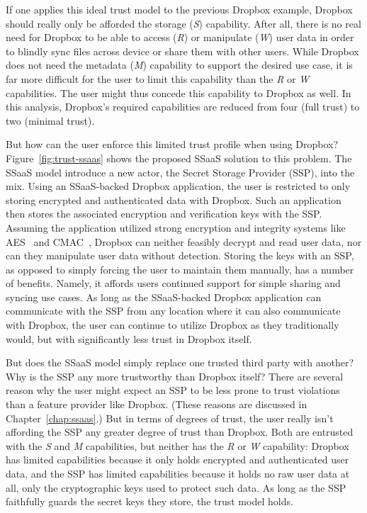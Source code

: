 If one applies this ideal trust model to the previous Dropbox example,
Dropbox should really only be afforded the storage (\emph{S})
capability. After all, there is no real need for Dropbox to be able to
access (\emph{R}) or manipulate (\emph{W}) user data in order to
blindly sync files across device or share them with other users. While
Dropbox does not need the metadata (\emph{M}) capability to support
the desired use case, it is far more difficult for the user to limit
this capability than the \emph{R} or \emph{W} capabilities. The user
might thus concede this capability to Dropbox as well. In this
analysis, Dropbox's required capabilities are reduced from four (full
trust) to two (minimal trust).

But how can the user enforce this limited trust profile when using
Dropbox?  Figure~\ref{fig:trust-ssaas} shows the proposed SSaaS
solution to this problem. The SSaaS model introduce a new actor, the
Secret Storage Provider (SSP), into the mix. Using an SSaaS-backed
Dropbox application, the user is restricted to only storing encrypted
and authenticated data with Dropbox. Such an application then stores
the associated encryption and verification keys with the SSP. Assuming
the application utilized strong encryption and integrity systems like
AES~\cite{nist2001} and CMAC~\cite{dworkin2005}, Dropbox can neither
feasibly decrypt and read user data, nor can they manipulate user data
without detection. Storing the keys with an SSP, as opposed to simply
forcing the user to maintain them manually, has a number of benefits.
Namely, it affords users continued support for simple sharing and
syncing use cases. As long as the SSaaS-backed Dropbox application can
communicate with the SSP from any location where it can also
communicate with Dropbox, the user can continue to utilize Dropbox as
they traditionally would, but with significantly less trust in Dropbox
itself.

But does the SSaaS model simply replace one trusted third party with
another? Why is the SSP any more trustworthy than Dropbox itself?
There are several reason why the user might expect an SSP to be less
prone to trust violations than a feature provider like Dropbox. (These
reasons are discussed in Chapter~\ref{chap:ssaas}.) But in terms of
degrees of trust, the user really isn't affording the SSP any greater
degree of trust than Dropbox. Both are entrusted with the \emph{S} and
\emph{M} capabilities, but neither has the \emph{R} or \emph{W}
capability: Dropbox has limited capabilities because it only holds
encrypted and authenticated user data, and the SSP has limited
capabilities because it holds no raw user data at all, only the
cryptographic keys used to protect such data. As long as the SSP
faithfully guards the secret keys they store, the trust model holds.

